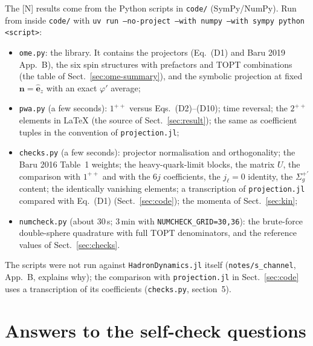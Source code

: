 \documentclass[11pt,a4paper]{article}
\newcommand{\tagN}{\textcolor{red!70!black}{\textsf{\small[N]}}}
\newcommand{\vn}{\bm n}
\begin{document}
{\sloppy
The \tagN{} results come from the Python scripts in \texttt{code/} (SymPy/NumPy). Run from inside \texttt{code/} with \texttt{uv run --no-project --with numpy --with sympy python <script>}:
\begin{itemize}
\item \texttt{ome.py}: the library. It contains the projectors (Eq.~(D1) and Baru 2019 App.~B), the six spin structures with prefactors and TOPT combinations (the table of Sect.~\ref{sec:ome-summary}), and the symbolic projection at fixed $\vn=\hat{\bm e}_z$ with an exact $\varphi'$ average;
\item \texttt{pwa.py} (a few seconds): $1^{++}$ versus Eqs.~(D2)--(D10); time reversal; the $2^{++}$ elements in \LaTeX{} (the source of Sect.~\ref{sec:result}); the same as coefficient tuples in the convention of \texttt{projection.jl};
\item \texttt{checks.py} (a few seconds): projector normalisation and orthogonality; the Baru 2016 Table~1 weights; the heavy-quark-limit blocks, the matrix $U$, the comparison with $1^{++}$ and with the 6$j$ coefficients, the $j_\ell=0$ identity, the $\Sigma_g^{+\prime}$ content; the identically vanishing elements; a transcription of \texttt{projection.jl} compared with Eq.~(D1) (Sect.~\ref{sec:code}); the momenta of Sect.~\ref{sec:kin};
\item \texttt{numcheck.py} (about 30\,s; 3\,min with \texttt{NUMCHECK\_GRID=30,36}): the brute-force double-sphere quadrature with full TOPT denominators, and the reference values of Sect.~\ref{sec:checks}.
\end{itemize}
The scripts were not run against \texttt{HadronDynamics.jl} itself (\texttt{notes/s\_channel}, App.~B, explains why); the comparison with \texttt{projection.jl} in Sect.~\ref{sec:code} uses a transcription of its coefficients (\texttt{checks.py}, section~5).
\par}

\section{Answers to the self-check questions}
\label{app:answers}
\end{document}
